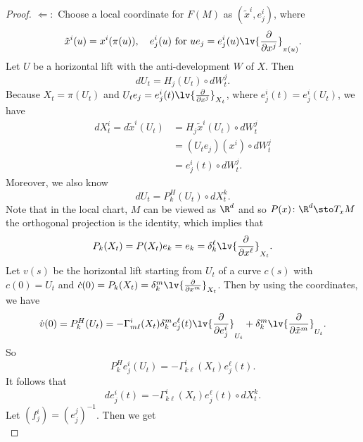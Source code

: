 \begin{proof}
    $\Leftarrow:$ Choose a local coordinate for $F(M)$ as $(\tilde{x}^i,e^i_j)$, where
    \begin{equation*}
        \tilde{x}^i(u) = x^i(\pi(u)),\quad e^i_j(u)~\text{for }ue_j = e^i_j(u) \lv{\frac{\partial}{\partial x^j}}_{\pi(u)}. 
    \end{equation*}
    Let $U$ be a horizontal lift with the anti-development $W$ of $X$. Then
    \begin{equation*}
        dU_t = H_j(U_t) \circ dW^j_t.
    \end{equation*}
    Because $X_t = \pi(U_t)$ and $U_te_j = e^i_j(t) \lv{\frac{\partial}{\partial x^j}}_{X_t}$, where $e^i_j(t) = e^i_j(U_t)$, we have
    \begin{align*}
        dX^i_t = d \tilde{x}^i(U_t) &= H_j\tilde{x}^i(U_t) \circ dW^j_t \\
        &= (U_te_j)(x^i) \circ dW^j_t \\
        &= e^i_j(t) \circ dW^j_t.
    \end{align*}
    Moreover, we also know
    \begin{equation*}
        dU_t = P^H_k(U_t) \circ dX^k_t.
    \end{equation*}
    Note that in the local chart, $M$ can be viewed as $\R^d$ and so $P(x) \colon \R^d \sto T_xM$ the orthogonal projection is the identity, which implies that
    \begin{equation*}
        P_k(X_t) = P(X_t) e_k = e_k = \delta^{\ell}_k\lv{\frac{\partial}{\partial x^\ell}}_{X_t}.
    \end{equation*}
    Let $v(s)$ be the horizontal lift starting from $U_t$ of a curve $c(s)$ with $c(0) = U_t$ and $\dot{c}(0) = P_k(X_t) =\delta^{m}_k\lv{\frac{\partial}{\partial x^m}}_{X_t}$. Then by using the coordinates, we have
    \begin{equation*}
        \dot{v}(0)= P^H_k(U_t) = - \Gamma^i_{m\ell}(X_t) \delta^{m}_k e^\ell_j(t) \lv{\frac{\partial}{\partial e^i_j}}_{U_t} + \delta^m_k \lv{\frac{\partial}{\partial \tilde{x}^m}}_{U_t}.
    \end{equation*}
    So
    \begin{equation*}
        P^H_ke^i_j(U_t) = - \Gamma^i_{k \ell}(X_t) e^\ell_j(t).
    \end{equation*}
    It follows that
    \begin{equation*}
        de^i_j(t) = - \Gamma^i_{k\ell}(X_t)e^\ell_j(t) \circ dX^k_t.
    \end{equation*}
    Let $(f^i_j) = (e^j_j)^{-1}$. Then we get
    \begin{equation*}

\end{equation*}
\end{proof}
